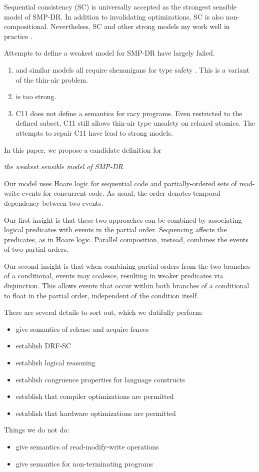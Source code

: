 Sequential consistency (SC) \citep{Lamport:1979:MMC:1311099.1311750} is
universally accepted as the strongest sensible model of SMP-DR.  In addition
to invalidating optimizations, SC is also non-compositional.  Nevertheless,
SC and other strong models my work well in practice
\cite{Singh:2012:ESC:2337159.2337220,Dolan:2018:BDR:3192366.3192421,Ou:2018:TUC:3288538.3276506,Liu:2019:ASC:3314221.3314611}.

Attempts to define a weakest model for SMP-DR have largely failed.
\begin{enumerate}
\item \citet{Manson:2005:JMM:1047659.1040336} and similar models
  \cite{DBLP:conf/esop/JagadeesanPR10,DBLP:conf/popl/KangHLVD17} all require
  shenanigans for type safety
  \cite{DBLP:journals/toplas/Lochbihler13,DBLP:conf/tldi/GotoJPR12}.  This is
  a variant of the thin-air problem.
\item \citet{DBLP:conf/lics/JeffreyR16} is too strong.
\item C11 does not define a semantics for racy programs.  Even restricted to
  the defined subset, C11 still allows thin-air type unsafety on relaxed
  atomics. The attempts to repair C11 have lead to strong models.
\end{enumerate}

In this paper, we propose a candidate definition for
\begin{center}
  \emph{the weakest sensible model of SMP-DR}.
\end{center}

Our model uses Hoare logic for sequential code and partially-ordered sets of
read-write events for concurrent code.  As usual, the order denotes temporal
dependency between two events.

Our first insight is that these two approaches can be combined by associating
logical predicates with events in the partial order.  Sequencing affects the
predicates, as in Hoare logic.  Parallel composition, instead, combines the
events of two partial orders.

Our second insight is that when combining partial orders from the two
branches of a conditional, events may coalesce, resulting in weaker
predicates via disjunction.  This allows events that occur within both
branches of a conditional to float in the partial order, independent of the
condition itself.

There are several details to sort out, which we dutifully perform:
\begin{itemize}
\item give semantics of release and acquire fences
\item establish DRF-SC
\item establish logical reasoning
\item establish congruence properties for language constructs
\item establish that compiler optimizations are permitted
\item establish that hardware optimizations are permitted
\end{itemize}

Things we do not do:
\begin{itemize}
\item give semantics of read-modify-write operations
\item give semantics for non-terminating programs
\end{itemize}


